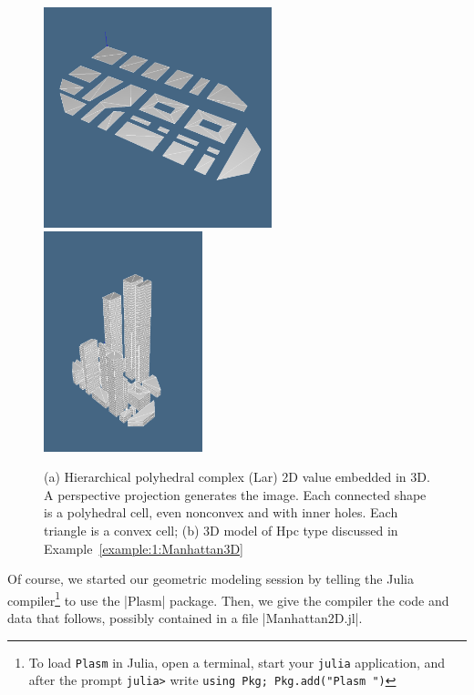 \begin{coding} 
\label{example:1:Manhattan2D}

\begin{figure}
\centering
   \includegraphics[width=0.59\textwidth]{chapter-01/figs/manhattan2d.pdf}%
   \includegraphics[width=0.41\textwidth]{chapter-01/figs/manhattan3d-1.pdf}

\caption{(a) Hierarchical polyhedral complex (Lar) 2D value embedded in 3D. A perspective projection generates the image. Each connected shape is a polyhedral cell, even nonconvex and with inner holes. Each triangle is a convex cell; (b) 3D model of Hpc type discussed in Example~\ref{example:1:Manhattan3D}}
\label{fig:1:FP}
\end{figure}

Of course, we started our geometric modeling session by telling the Julia compiler\footnote{To load \texttt{Plasm} in Julia, open a terminal, start your \texttt{julia} application, and after the prompt \texttt{julia>} write \texttt{using Pkg; Pkg.add("Plasm ")}} to use the |Plasm| package. Then, we give the compiler the code and data that follows, possibly contained in a file |Manhattan2D.jl|.


\end{coding}
